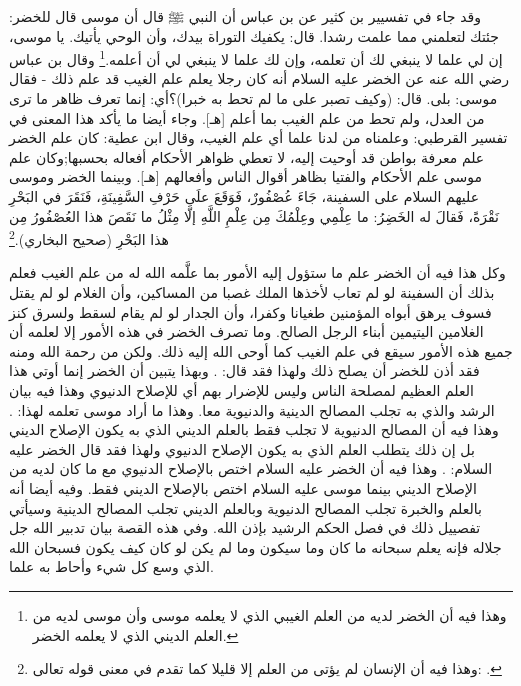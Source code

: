 وقد جاء في تفسيير بن كثير عن بن عباس أن النبي ﷺ قال أن موسى قال للخضر: جئتك لتعلمني مما علمت رشدا. قال: يكفيك التوراة بيدك، وأن الوحي يأتيك. يا موسى، إن لي علما لا ينبغي لك أن تعلمه، وإن لك علما لا ينبغي لي أن أعلمه.\footnote{وهذا فيه أن الخضر لديه من العلم الغيبي الذي لا يعلمه موسى وأن موسى لديه من العلم الديني الذي لا يعلمه الخضر.} وقال بن عباس رضي الله عنه عن الخضر عليه السلام أنه كان رجلا يعلم علم الغيب قد علم ذلك - فقال موسى: بلى. قال: (وكيف تصبر على ما لم تحط به خبرا)؟أي: إنما تعرف ظاهر ما ترى من العدل، ولم تحط من علم الغيب بما أعلم [هـ]. وجاء أيضا ما يأكد هذا المعنى في تفسير القرطبي: وعلمناه من لدنا علما أي علم الغيب، وقال ابن عطية: كان علم الخضر علم معرفة بواطن قد أوحيت إليه، لا تعطي ظواهر الأحكام أفعاله بحسبها;وكان علم موسى علم الأحكام والفتيا بظاهر أقوال الناس وأفعالهم [هـ].
وبينما الخضر وموسى عليهم السلام على السفينة، جَاءَ عُصْفُورٌ، فَوَقَعَ علَى حَرْفِ السَّفِينَةِ، فَنَقَرَ في البَحْرِ نَقْرَةً، فَقالَ له الخَضِرُ: ما عِلْمِي وعِلْمُكَ مِن عِلْمِ اللَّهِ إلَّا مِثْلُ ما نَقَصَ هذا العُصْفُورُ مِن هذا البَحْرِ {\footnotesize (صحيح البخاري)}.\footnote{وهذا فيه أن الإنسان لم يؤتى من العلم إلا قليلا كما تقدم في معنى قوله تعالى:
\quranayah*[17][85]{\footnotesize \surahname*[17]}.} 

وكل هذا فيه أن الخضر علم ما ستؤول إليه الأمور بما علَّمه الله له من علم الغيب فعلم بذلك أن السفينة لو لم تعاب لأخذها الملك غصبا من المساكين، وأن الغلام لو لم يقتل فسوف يرهق أبواه المؤمنين طغيانا وكفرا، وأن الجدار لو لم يقام لسقط ولسرق كنز الغلامين اليتيمين أبناء الرجل الصالح. وما تصرف الخضر في هذه الأمور إلا لعلمه أن جميع هذه الأمور سيقع في علم الغيب كما أوحى الله إليه ذلك. ولكن من رحمة الله ومنه فقد أذن للخضر أن يصلح ذلك ولهذا فقد قال: 
\quranayah*[18][82][25]{\footnotesize \surahname*[18]}. وبهذا يتبين أن الخضر إنما أوتي هذا العلم العظيم لمصلحة الناس وليس للإضرار بهم أي للإصلاح الدنيوي وهذا فيه بيان الرشد والذي به تجلب المصالح الدينية والدنيوية معا. وهذا ما أراد موسى تعلمه لهذا: 
\quranayah*[18][66]{\footnotesize \surahname*[18]}. وهذا فيه أن المصالح الدنيوية لا تجلب فقط بالعلم الديني الذي به يكون الإصلاح الديني بل إن ذلك يتطلب العلم الذي به يكون الإصلاح الدنيوي ولهذا فقد قال الخضر عليه السلام: 
 \quranayah*[18][67-68]{\footnotesize \surahname*[18]}. وهذا فيه أن الخضر عليه السلام اختص بالإصلاح الدنيوي مع ما كان لديه من الإصلاح الديني بينما موسى عليه السلام اختص بالإصلاح الديني فقط. وفيه أيضا أنه بالعلم والخبرة تجلب المصالح الدنيوية وبالعلم الديني تجلب المصالح الدينية وسيأتي تفصييل ذلك في فصل الحكم الرشيد بإذن الله. وفي هذه القصة بيان تدبير الله جل جلاله فإنه يعلم سبحانه ما كان وما سيكون وما لم يكن لو كان كيف يكون فسبحان الله الذي وسع كل شيء وأحاط به علما.

